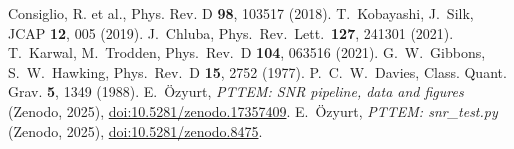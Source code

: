 \documentclass[preprint,aps,prd,onecolumn,nofootinbib,longbibliography]{revtex4-2}
\numberwithin{equation}{section}
\begin{document}
{\begin{thebibliography}{99}
 Consiglio, R. et al., Phys. Rev. D \textbf{98}, 103517 (2018).
 T.~Kobayashi, J.~Silk, JCAP \textbf{12}, 005 (2019).
 J.~Chluba, Phys.\ Rev.\ Lett.\ \textbf{127}, 241301 (2021).
 T.~Karwal, M.~Trodden, Phys.\ Rev.\ D \textbf{104}, 063516 (2021).
 G.~W.~Gibbons, S.~W.~Hawking, Phys.\ Rev.\ D \textbf{15}, 2752 (1977).
 P.~C.~W.~Davies, Class. Quant. Grav. \textbf{5}, 1349 (1988).
E.~\"Ozyurt, \emph{PTTEM: SNR pipeline, data and figures} (Zenodo, 2025),
\href{https://doi.org/10.5281/zenodo.17357409}{doi:10.5281/zenodo.17357409}.
E.~\"Ozyurt, \emph{PTTEM: snr\_test.py} (Zenodo, 2025),
\href{https://doi.org/10.5281/zenodo.8475}{doi:10.5281/zenodo.8475}.

\end{thebibliography}
}
\end{document}
